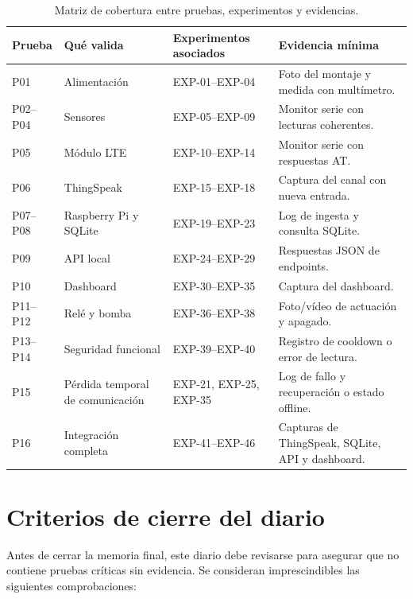 \begin{table}[H]
\centering
\renewcommand{\arraystretch}{1.25}
\scriptsize
\begin{tabular}{|p{}|p{}|p{}|p{}|}
\hline
\rowcolor{gray!20}
\textbf{Prueba} & \textbf{Qué valida} & \textbf{Experimentos asociados} & \textbf{Evidencia mínima} \\
\hline
P01 & Alimentación & EXP-01--EXP-04 & Foto del montaje y medida con multímetro. \\
\hline
P02--P04 & Sensores & EXP-05--EXP-09 & Monitor serie con lecturas coherentes. \\
\hline
P05 & Módulo LTE & EXP-10--EXP-14 & Monitor serie con respuestas AT. \\
\hline
P06 & ThingSpeak & EXP-15--EXP-18 & Captura del canal con nueva entrada. \\
\hline
P07--P08 & Raspberry Pi y SQLite & EXP-19--EXP-23 & Log de ingesta y consulta SQLite. \\
\hline
P09 & API local & EXP-24--EXP-29 & Respuestas JSON de endpoints. \\
\hline
P10 & Dashboard & EXP-30--EXP-35 & Captura del dashboard. \\
\hline
P11--P12 & Relé y bomba & EXP-36--EXP-38 & Foto/vídeo de actuación y apagado. \\
\hline
P13--P14 & Seguridad funcional & EXP-39--EXP-40 & Registro de cooldown o error de lectura. \\
\hline
P15 & Pérdida temporal de comunicación & EXP-21, EXP-25, EXP-35 & Log de fallo y recuperación o estado offline. \\
\hline
P16 & Integración completa & EXP-41--EXP-46 & Capturas de ThingSpeak, SQLite, API y dashboard. \\
\hline
\end{tabular}
\caption{Matriz de cobertura entre pruebas, experimentos y evidencias.}
\label{tab:matriz_pruebas_evidencias}
\end{table}

\section{Criterios de cierre del diario}

Antes de cerrar la memoria final, este diario debe revisarse para asegurar que no contiene pruebas críticas sin evidencia. Se consideran imprescindibles las siguientes comprobaciones:

